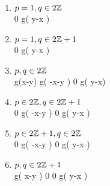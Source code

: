 \begin{enumerate}[(1)]
	\item $p=1,q\in2\mathbb{Z}$\\
\hspace*{0cm}\commonShift\mytableThreeTwo	%
{}		{}
{\yipx}			{0}
{\yimx}			{g\kern-0.05cm\left( {y-x} \right)}
	\item $p=1,q\in2\mathbb{Z}+1$\\
\hspace*{0cm}\commonShift\mytableThreeTwo	%
{}		{}
{\yipx}			{0}
{\yimx}			{g\kern-0.05cm\left( {y-x} \right)}
	\item $p,q\in2\mathbb{Z}$\\
\hspace*{-0cm}\commonShift\mytable	%
{}	{\yipy}					{\yimy}
{\yipx}	{g\kern-0.05cm\left({x-y}\right)} 	{g\kern-0.05cm\left( {-x-y} \right)}
{\yipx}	{0} 					{g\kern-0.05cm\left( {y-x}\right)}
\item $p\in2\mathbb{Z},q\in2\mathbb{Z}+1$\\
\commonShift\mytable	%
{}	{\yipy}	{\yimy}
{\yipx} {0}	{g\kern-0.05cm\left( {-x-y} \right)}
{\yimx} {0} 	{g\kern-0.05cm\left( {y-x} \right)}
\item $p\in2\mathbb{Z}+1,q\in2\mathbb{Z}$\\
\commonShift\mytable	%
{}		{\yipy}		{\yimy}
{\yipx}		{0} 		{g\kern-0.05cm\left( {-x-y} \right)}	
{\yimx} 	{0} 		{g\kern-0.05cm\left( {y-x} \right)}
\item $p,q\in2\mathbb{Z}+1$\\
\commonShift\mytable	%
{}		{\yipy}							{\yimy}
{{\yipx}}	{g\kern-0.05cm\left( {x-y} \right)}			{0}
{{\yimx}}	{0}							{g\kern-0.05cm\left( {y-x} \right)}	
\end{enumerate}
